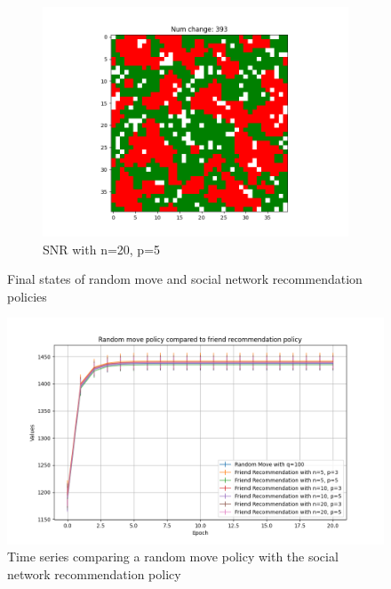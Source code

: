 \documentclass[11pt]{article}
\begin{document}
\begin{figure}[h]
\begin{subfigure}{0.14\textwidth}
			\includegraphics[width=\linewidth]{final_social_n20p5.png}
			\caption{\centering SNR with n=20, p=5}
		\end{subfigure}
		\caption{Final states of random move and social network recommendation policies}
	\end{figure}
	\vspace{-1em} %
	\begin{figure}[h]
		\centering
		\includegraphics[width=\textwidth]{policies01.png}
		\caption{Time series comparing a random move policy with the social network recommendation policy}
		\label{p2_ts}
	\end{figure}
	\FloatBarrier
\end{document}

